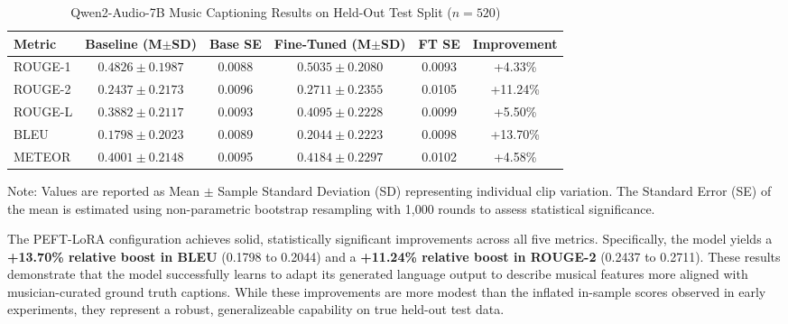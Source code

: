 \documentclass[12pt, conference, letterpaper]{IEEEtran}
\begin{document}
\begin{table}[t]
    \centering
    \footnotesize
    \caption{Qwen2-Audio-7B Music Captioning Results on Held-Out Test Split ($n=520$)}
    \label{tab:qwen_results}
    \begin{tabular}{lccccc}
        \toprule
        \textbf{Metric} & \textbf{Baseline (M$\pm$SD)} & \textbf{Base SE} & \textbf{Fine-Tuned (M$\pm$SD)} & \textbf{FT SE} & \textbf{Improvement} \\ \midrule
        ROUGE-1         & $0.4826 \pm 0.1987$          & 0.0088           & $0.5035 \pm 0.2080$            & 0.0093         & +4.33\%              \\
        ROUGE-2         & $0.2437 \pm 0.2173$          & 0.0096           & $0.2711 \pm 0.2355$            & 0.0105         & +11.24\%             \\
        ROUGE-L         & $0.3882 \pm 0.2117$          & 0.0093           & $0.4095 \pm 0.2228$            & 0.0099         & +5.50\%              \\
        BLEU            & $0.1798 \pm 0.2023$          & 0.0089           & $0.2044 \pm 0.2223$            & 0.0098         & +13.70\%             \\
        METEOR          & $0.4001 \pm 0.2148$          & 0.0095           & $0.4184 \pm 0.2297$            & 0.0102         & +4.58\%              \\
        \bottomrule
    \end{tabular}
    \vspace{1ex}
    \begin{flushleft}
        \scriptsize Note: Values are reported as Mean $\pm$ Sample Standard Deviation (SD) representing individual clip variation. The Standard Error (SE) of the mean is estimated using non-parametric bootstrap resampling with 1,000 rounds to assess statistical significance.
    \end{flushleft}
\end{table}

The PEFT-LoRA configuration achieves solid, statistically significant improvements across all five metrics. Specifically, the model yields a \textbf{+13.70\% relative boost in BLEU} (0.1798 to 0.2044) and a \textbf{+11.24\% relative boost in ROUGE-2} (0.2437 to 0.2711). These results demonstrate that the model successfully learns to adapt its generated language output to describe musical features more aligned with musician-curated ground truth captions. While these improvements are more modest than the inflated in-sample scores observed in early experiments, they represent a robust, generalizeable capability on true held-out test data.
\end{document}
